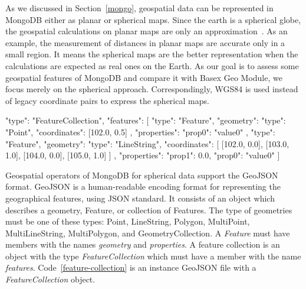 \documentclass[a4paper,12pt]{article}
\begin{document}
As we discussed in Section~\ref{mongo}, geospatial data can be represented in MongoDB either as planar or spherical maps. Since the earth is a spherical globe, the geospatial calculations on planar maps are only an approximation~\cite{coordsys,coordsys-mongo}. As an example, the measurement of distances in planar maps are accurate only in a small region. It means the spherical maps are the better representation when the calculations are expected as real ones on the Earth. As our goal is to assess some geospatial features of MongoDB and compare it with Basex Geo Module, we focus merely on the spherical approach. Correspondingly, WGS84 is used instead of legacy coordinate pairs to express the spherical maps. 

\vspace{10px}
\begin{fakeXML}[label=feature-collection,caption=A GeoJSON file containing a \textit{FeatureCollection} object]
{
  "type": "FeatureCollection",
  "features": [
    {
      "type": "Feature",
      "geometry": {
        "type": "Point",
        "coordinates": [102.0, 0.5]
      },
      "properties": {
        "prop0": "value0"
      }
    },
    {
      "type": "Feature",
      "geometry": {
        "type": "LineString",
        "coordinates": [
          [102.0, 0.0], [103.0, 1.0], [104.0, 0.0], [105.0, 1.0]
        ]
      },
      "properties": {
        "prop1": 0.0,
        "prop0": "value0"
      }
    }
  ]
}
\end{fakeXML}
\vspace{10px}


Geospatial operators of MongoDB for spherical data support the GeoJSON \cite{www/geojson} format. GeoJSON is a human-readable encoding format for representing the geographical features, using JSON standard. It consists of an object which describes a geometry, Feature, or collection of Features. The type of geometries must be one of these types: Point, LineString, Polygon, MultiPoint, MultiLineString, MultiPolygon, and GeometryCollection. A \textit{Feature} must have members with the names \textit{geometry} and \textit{properties}. A feature collection is an object with the type \textit{FeatureCollection} which must have a member with the name \textit{features}. Code~\ref{feature-collection} is an instance GeoJSON file with a \textit{FeatureCollection} object.
\end{document}
